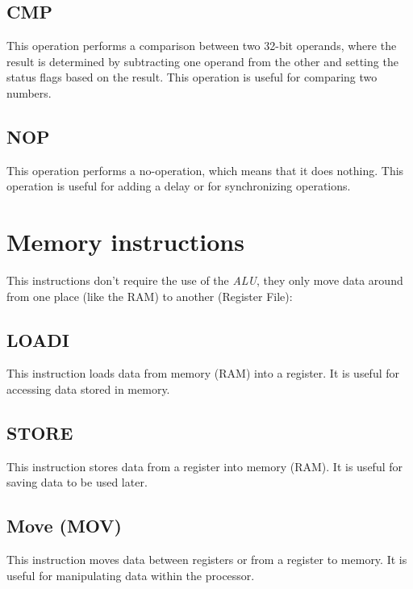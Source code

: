 \documentclass[9pt,a4paper,twoside]{tau}
\begin{document}
        \subsection{CMP}
        This operation performs a comparison between two 32-bit operands, where the result is determined by subtracting one operand from the other and setting the status flags based on the result. This operation is useful for comparing two numbers. 
        \subsection{NOP}
        This operation performs a no-operation, which means that it does nothing. This operation is useful for adding a delay or for synchronizing operations.
    
    
        \section{Memory instructions}
        This instructions don't require the use of the \textit{ALU}, they only move data around from one place (like the RAM) to another (Register File):
    
        \subsection{LOADI}
        This instruction loads data from memory (RAM) into a register. It is useful for accessing data stored in memory. 
        \subsection{STORE}
        This instruction stores data from a register into memory (RAM). It is useful for saving data to be used later.
        \subsection{Move (MOV)}
        This instruction moves data between registers or from a register to memory. It is useful for manipulating data within the processor.
    
\end{document}
